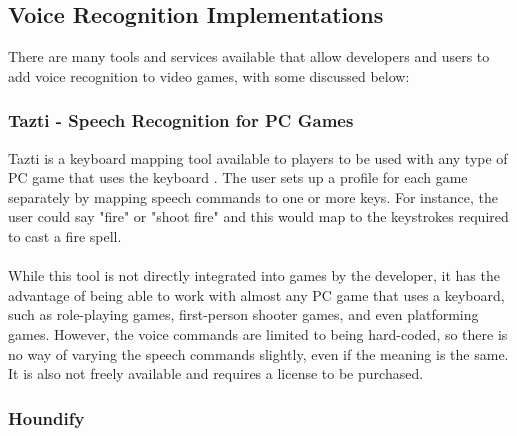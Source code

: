 \documentclass[12pt]{article}
\begin{document}
\subsection{Voice Recognition Implementations}

There are many tools and services available that allow developers and users to add voice recognition to video games, with some discussed below:

\subsubsection{Tazti - Speech Recognition for PC Games}

Tazti is a keyboard mapping tool available to players to be used with any type of PC game that uses the keyboard \cite{RefWorks:28}. The user sets up a profile for each game separately by mapping speech commands to one or more keys. For instance, the user could say "fire" or "shoot fire" and this would map to the keystrokes required to cast a fire spell.
\\
\\
While this tool is not directly integrated into games by the developer, it has the advantage of being able to work with almost any PC game that uses a keyboard, such as role-playing games, first-person shooter games, and even platforming games. However, the voice commands are limited to being hard-coded, so there is no way of varying the speech commands slightly, even if the meaning is the same. It is also not freely available and requires a license to be purchased.

\subsubsection{Houndify}
\end{document}
